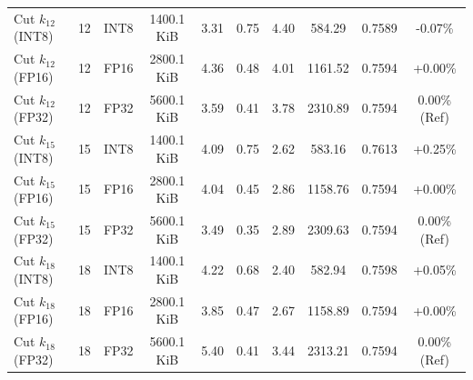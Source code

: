 \begin{tabular}{@{}lccccccccc@{}}
Cut $k_{12}$ (INT8) & 12 & INT8 & 1400.1 KiB & 3.31 & 0.75 & 4.40 & 584.29 & 0.7589 & -0.07\% \\
Cut $k_{12}$ (FP16) & 12 & FP16 & 2800.1 KiB & 4.36 & 0.48 & 4.01 & 1161.52 & 0.7594 & +0.00\% \\
Cut $k_{12}$ (FP32) & 12 & FP32 & 5600.1 KiB & 3.59 & 0.41 & 3.78 & 2310.89 & 0.7594 & 0.00\% (Ref) \\
Cut $k_{15}$ (INT8) & 15 & INT8 & 1400.1 KiB & 4.09 & 0.75 & 2.62 & 583.16 & 0.7613 & +0.25\% \\
Cut $k_{15}$ (FP16) & 15 & FP16 & 2800.1 KiB & 4.04 & 0.45 & 2.86 & 1158.76 & 0.7594 & +0.00\% \\
Cut $k_{15}$ (FP32) & 15 & FP32 & 5600.1 KiB & 3.49 & 0.35 & 2.89 & 2309.63 & 0.7594 & 0.00\% (Ref) \\
Cut $k_{18}$ (INT8) & 18 & INT8 & 1400.1 KiB & 4.22 & 0.68 & 2.40 & 582.94 & 0.7598 & +0.05\% \\
Cut $k_{18}$ (FP16) & 18 & FP16 & 2800.1 KiB & 3.85 & 0.47 & 2.67 & 1158.89 & 0.7594 & +0.00\% \\
Cut $k_{18}$ (FP32) & 18 & FP32 & 5600.1 KiB & 5.40 & 0.41 & 3.44 & 2313.21 & 0.7594 & 0.00\% (Ref) \\
\bottomrule
\end{tabular}
